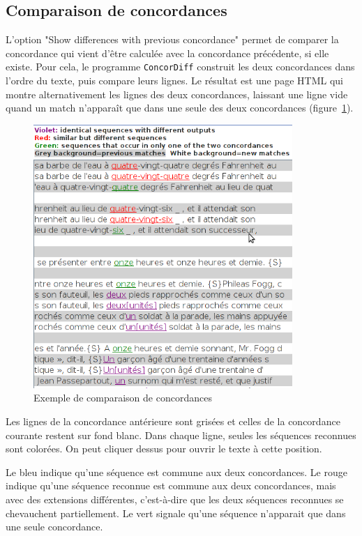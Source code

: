 \subsection{Comparaison de concordances}
\label{section-comparing-concordances}
L’option "Show differences with previous concordance" permet de comparer la concordance
qui vient d’être calculée avec la concordance précédente, si elle existe. Pour cela, le programme
\verb+ConcorDiff+ construit les deux concordances dans l’ordre du texte, puis compare leurs lignes.
Le résultat est une page HTML qui montre alternativement les lignes des deux concordances, laissant
une ligne vide quand un match n'apparaît que dans une seule des deux concordances (figure~\ref{fig-concordiff}).

\begin{figure}[!ht]
\begin{center}
\includegraphics[height=10cm]{resources/img/fig6-33.png}
\caption{Exemple de comparaison de concordances\label{fig-concordiff}}
\end{center}
\end{figure}

\bigskip
\noindent Les lignes de la
concordance antérieure sont grisées et celles de la concordance courante restent sur fond blanc.
Dans chaque ligne, seules les séquences reconnues sont colorées. On peut cliquer dessus pour
ouvrir le texte à cette position.

\bigskip
\noindent Le bleu indique qu'une séquence est commune aux deux concordances. Le rouge indique qu'une séquence
reconnue est commune aux deux concordances, mais avec des extensions différentes, c'est-à-dire que les
deux séquences reconnues se chevauchent partiellement. Le vert signale qu'une séquence n'apparait
que dans une seule concordance.

